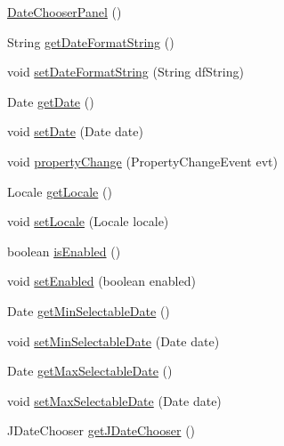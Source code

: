 \begin{DoxyCompactItemize}
\item 
\hyperlink{classde_1_1turnierverwaltung_1_1view_1_1_date_chooser_panel_ae67b8f0f9cf4302c4fcbd9bbbba20e4e}{Date\+Chooser\+Panel} ()
\item 
String \hyperlink{classde_1_1turnierverwaltung_1_1view_1_1_date_chooser_panel_a7f7acb7a6ec9b6147dc592b2d4624eec}{get\+Date\+Format\+String} ()
\item 
void \hyperlink{classde_1_1turnierverwaltung_1_1view_1_1_date_chooser_panel_a87f5e0cf2eb0006faf3831eee70745ac}{set\+Date\+Format\+String} (String df\+String)
\item 
Date \hyperlink{classde_1_1turnierverwaltung_1_1view_1_1_date_chooser_panel_a4b62e91881a1a4dc5fd23641d9c0e2ad}{get\+Date} ()
\item 
void \hyperlink{classde_1_1turnierverwaltung_1_1view_1_1_date_chooser_panel_a8ee9c707b25dac81b36d22efc0a33b9e}{set\+Date} (Date date)
\item 
void \hyperlink{classde_1_1turnierverwaltung_1_1view_1_1_date_chooser_panel_a902e6b34a4954839cab712ffb743fffa}{property\+Change} (Property\+Change\+Event evt)
\item 
Locale \hyperlink{classde_1_1turnierverwaltung_1_1view_1_1_date_chooser_panel_a750c8578a0fab717498989bcd79a2465}{get\+Locale} ()
\item 
void \hyperlink{classde_1_1turnierverwaltung_1_1view_1_1_date_chooser_panel_a11382782e4a1c49247bbb1bfc652aca4}{set\+Locale} (Locale locale)
\item 
boolean \hyperlink{classde_1_1turnierverwaltung_1_1view_1_1_date_chooser_panel_a5707411b3d5f7bc07ace71bf9a720a9c}{is\+Enabled} ()
\item 
void \hyperlink{classde_1_1turnierverwaltung_1_1view_1_1_date_chooser_panel_a22255308624233f5f49dbb69d6cdd3ef}{set\+Enabled} (boolean enabled)
\item 
Date \hyperlink{classde_1_1turnierverwaltung_1_1view_1_1_date_chooser_panel_a5916e91ed7febc9e2530ee0fce115d95}{get\+Min\+Selectable\+Date} ()
\item 
void \hyperlink{classde_1_1turnierverwaltung_1_1view_1_1_date_chooser_panel_afd6342f6f438eff848a74a3ce4510a91}{set\+Min\+Selectable\+Date} (Date date)
\item 
Date \hyperlink{classde_1_1turnierverwaltung_1_1view_1_1_date_chooser_panel_add324c6b2ab3e0d065558cd7cbe54c4b}{get\+Max\+Selectable\+Date} ()
\item 
void \hyperlink{classde_1_1turnierverwaltung_1_1view_1_1_date_chooser_panel_ac15f6cc8478d3476bbffc2fed4584a58}{set\+Max\+Selectable\+Date} (Date date)
\item 
J\+Date\+Chooser \hyperlink{classde_1_1turnierverwaltung_1_1view_1_1_date_chooser_panel_ab040d9da8166dd2b3e7ea54d19a29e25}{get\+J\+Date\+Chooser} ()
\end{DoxyCompactItemize}


